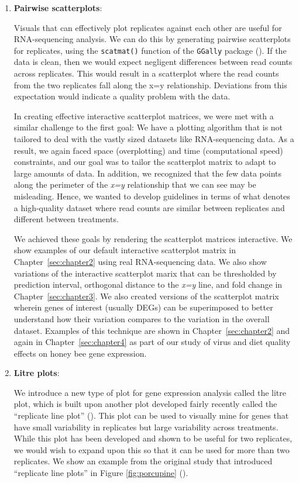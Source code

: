 \documentclass[11pt,a4paper,oldfontcommands,openany]{memoir}
\numberwithin{equation}{section} %
\newcommand{\code}[1]{{\texttt{#1}}}
\begin{document}
\begin{enumerate}
\item \textbf{Pairwise scatterplots}:

Visuals that can effectively plot replicates against each other are useful for RNA-sequencing analysis. We can do this by generating pairwise scatterplots for replicates, using the \code{scatmat()} function of the \code{GGally} package (\citealt{ggally}). If the data is clean, then we would expect negligent differences between read counts across replicates. This would result in a scatterplot where the read counts from the two replicates fall along the x=y relationship. Deviations from this expectation would indicate a quality problem with the data.

In creating effective interactive scatterplot matrices, we were met with a similar challenge to the first goal: We have a plotting algorithm that is not tailored to deal with the vastly sized datasets like RNA-sequencing data. As a result, we again faced space (overplotting) and time (computational speed) constraints, and our goal was to tailor the scatterplot matrix to adapt to large amounts of data. In addition, we recognized that the few data points along the perimeter of the \textit{x=y} relationship that we can see may be misleading. Hence, we wanted to develop guidelines in terms of what denotes a high-quality dataset where read counts are similar between replicates and different between treatments. 

We achieved these goals by rendering the scatterplot matrices interactive. We show examples of our default interactive scatterplot matrix in Chapter~\ref{sec:chapter2} using real RNA-sequencing data. We also show variations of the interactive scatterplot marix that can be thresholded by prediction interval, orthogonal distance to the \textit{x=y} line, and fold change in Chapter~\ref{sec:chapter3}. We also created versions of the scatterplot matrix wherein genes of interest (usually DEGs) can be superimposed to better understand how their variation compares to the variation in the overall dataset. Examples of this technique are shown in Chapter~\ref{sec:chapter2} and again in Chapter~\ref{sec:chapter4} as part of our study of virus and diet quality effects on honey bee gene expression.

\item \textbf{Litre plots}:

We introduce a new type of plot for gene expression analysis called the litre plot, which is built upon another plot developed fairly recently called the ``replicate line plot'' (\citealt{jds}). This plot can be used to visually mine for genes that have small variability in replicates but large variability across treatments. While this plot has been developed and shown to be useful for two replicates, we would wish to expand upon this so that it can be used for more than two replicates. We show an example from the original study that introduced ``replicate line plots'' in Figure \ref{fig:porcupine} (\citealt{jds}).


\end{enumerate}
\end{document}
